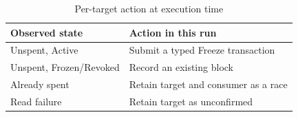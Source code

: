\begin{table}[htbp]\centering\small
    \setcounter{table}{3}\caption{Per-target action at execution time}
    \begin{tabularx}{\linewidth}{@{}XX@{}}\toprule
        \textbf{Observed state} & \textbf{Action in this run}          \\ \midrule
        Unspent, Active         & Submit a typed Freeze transaction    \\
        Unspent, Frozen/Revoked & Record an existing block             \\
        Already spent           & Retain target and consumer as a race \\
        Read failure            & Retain target as unconfirmed         \\
        \bottomrule\end{tabularx}\end{table}
